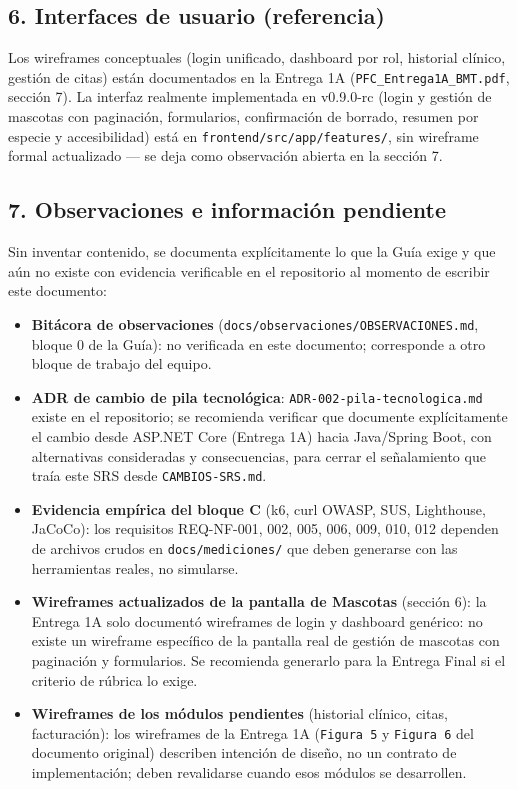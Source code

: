 \documentclass[
]{article}
\providecommand{\tightlist}{%
  \setlength{\itemsep}{0pt}\setlength{\parskip}{0pt}}
\begin{document}
\hypertarget{interfaces-de-usuario-referencia}{%
\subsection{6. Interfaces de usuario
(referencia)}\label{interfaces-de-usuario-referencia}}

Los wireframes conceptuales (login unificado, dashboard por rol,
historial clínico, gestión de citas) están documentados en la Entrega 1A
(\texttt{PFC\_Entrega1A\_BMT.pdf}, sección 7). La interfaz realmente
implementada en v0.9.0-rc (login y gestión de mascotas con paginación,
formularios, confirmación de borrado, resumen por especie y
accesibilidad) está en \texttt{frontend/src/app/features/}, sin
wireframe formal actualizado --- se deja como observación abierta en la
sección 7.

\hypertarget{observaciones-e-informaciuxf3n-pendiente}{%
\subsection{7. Observaciones e información
pendiente}\label{observaciones-e-informaciuxf3n-pendiente}}

Sin inventar contenido, se documenta explícitamente lo que la Guía exige
y que aún no existe con evidencia verificable en el repositorio al
momento de escribir este documento:

\begin{itemize}
\tightlist
\item
  \textbf{Bitácora de observaciones}
  (\texttt{docs/observaciones/OBSERVACIONES.md}, bloque 0 de la Guía):
  no verificada en este documento; corresponde a otro bloque de trabajo
  del equipo.
\item
  \textbf{ADR de cambio de pila tecnológica}:
  \texttt{ADR-002-pila-tecnologica.md} existe en el repositorio; se
  recomienda verificar que documente explícitamente el cambio desde
  ASP.NET Core (Entrega 1A) hacia Java/Spring Boot, con alternativas
  consideradas y consecuencias, para cerrar el señalamiento que traía
  este SRS desde \texttt{CAMBIOS-SRS.md}.
\item
  \textbf{Evidencia empírica del bloque C} (k6, curl OWASP, SUS,
  Lighthouse, JaCoCo): los requisitos REQ-NF-001, 002, 005, 006, 009,
  010, 012 dependen de archivos crudos en \texttt{docs/mediciones/} que
  deben generarse con las herramientas reales, no simularse.
\item
  \textbf{Wireframes actualizados de la pantalla de Mascotas} (sección
  6): la Entrega 1A solo documentó wireframes de login y dashboard
  genérico: no existe un wireframe específico de la pantalla real de
  gestión de mascotas con paginación y formularios. Se recomienda
  generarlo para la Entrega Final si el criterio de rúbrica lo exige.
\item
  \textbf{Wireframes de los módulos pendientes} (historial clínico,
  citas, facturación): los wireframes de la Entrega 1A
  (\texttt{Figura\ 5} y \texttt{Figura\ 6} del documento original)
  describen intención de diseño, no un contrato de implementación; deben
  revalidarse cuando esos módulos se desarrollen.
\end{itemize}
\end{document}
